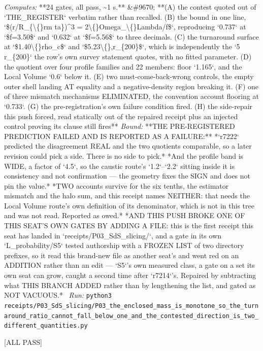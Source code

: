\begin{description}
\emph{Computes:} **24 gates, all pass, \textasciitilde{}1 s.** \&\#9670; **(A) the contest quoted out of `THE\_REGISTER` verbatim rather than recalled. (B) the bound in one line, `\$(r/R\_\{\textbackslash\{\}rm ta\})\textasciicircum{}3 = 2\textbackslash\{\}Omega\_\textbackslash\{\}Lambda/f\$`, reproducing `0.737` at `\$f=3.50\$` and `0.632` at `\$f=5.56\$` to three decimals. (C) the turnaround surface at `\$1.40\textbackslash\{\}rho\_c\$` and `\$5.23\textbackslash\{\},r\_\{200\}\$`, which is independently the `5 r\_\{200\}` the row's own survey statement quotes, with no fitted parameter. (D) the quotient over four profile families and 22 members: floor `1.165`, and the Local Volume `0.6` below it. (E) two must-come-back-wrong controls, the empty outer shell landing AT equality and a negative-density region breaking it. (F) one of three mismatch mechanisms ELIMINATED, the convention account flooring at `0.733`. (G) the pre-registration's own failure condition fired. (H) the side-repair this push forced, read statically out of the repaired receipt plus an injected control proving its clause still fires**
 \emph{Bound:}  **THE PRE-REGISTERED PREDICTION FAILED AND IS REPORTED AS A FAILURE:** *`r7222` predicted the disagreement REAL and the two quotients comparable, so a later revision could pick a side. There is no side to pick.*  *And the profile band is WIDE, a factor of `4.5`, so the caustic route's `1.2`--`2.2` sitting inside it is consistency and not confirmation --- the geometry fixes the SIGN and does not pin the value.*  *TWO accounts survive for the six tenths, the estimator mismatch and the halo sum, and this receipt names NEITHER: that needs the Local Volume route's own definition of its denominator, which is not in this tree and was not read. Reported as owed.*  *AND THIS PUSH BROKE ONE OF THIS SEAT'S OWN GATES BY ADDING A FILE: this is the first receipt this seat has landed in `receipts/P03\_SdS\_slicing/`, and a gate in its own `L\_probability/S5` tested authorship with a FROZEN LIST of two directory prefixes, so it read this brand-new file as another seat's and went red on an ADDITION rather than an edit --- `S5`'s own measured class, a gate on a set its own seat can grow, caught a second time after `r7214`'s. Repaired by subtracting what THIS BRANCH ADDED rather than by lengthening the list, and gated as NOT VACUOUS.*
\ \emph{Run:} \texttt{python3 receipts/P03\_SdS\_slicing/P03\_the\_enclosed\_mass\_is\_monotone\_so\_the\_turnaround\_ratio\_cannot\_fall\_below\_one\_and\_the\_contested\_direction\_is\_two\_different\_quantities.py}
\item[\rcptlabel{P03_the_substrate_does_not_display_the_tidal_discriminant}{P3R74}\textbf{P3R74}\quad\texttt{P03\_the\_substrate\_does\_not\_display\_the\_tidal\_discriminant}]\hfill\textsf{[ALL PASS]}\\

\end{description}
